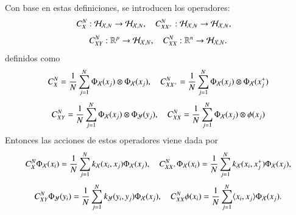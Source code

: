Con base en estas definiciones, se introducen los operadores:
\begin{equation*}
    C_{X}^N : \mathcal{H}_{\mathcal{X}, N} \to \mathcal{H}_{\mathcal{X}, N}, \quad C_{XX^+}^N : \mathcal{H}_{\mathcal{X}, N} \to \mathcal{H}_{\mathcal{X}, N}, \quad 
\end{equation*}
\begin{equation*}
    C_{XY}^N : \mathbb{R}^p \to \mathcal{H}_{\mathcal{X}, N}, \quad C_{XX}^N : \mathbb{R}^n \to \mathcal{H}_{\mathcal{X}, N}.
\end{equation*}
definidos como
\[
C_X^N = \frac{1}{N} \sum_{j=1}^N \Phi_{\mathcal{X}} (x_j) \otimes \Phi_{\mathcal{X}} (x_j), \quad C_{XX^+}^N = \frac{1}{N} \sum_{j=1}^N \Phi_{\mathcal{X}} (x_j) \otimes \Phi_{\mathcal{X}} (x_j^+)
\]
\[
C_{XY}^N = \frac{1}{N} \sum_{j=1}^N \Phi_{\mathcal{X}} (x_j) \otimes \Phi_{\mathcal{Y}} (y_j), \quad C_{XX}^N = \frac{1}{N} \sum_{j=1}^N \Phi_{\mathcal{X}} (x_j) \otimes \phi (x_j)
\]
Entonces las acciones de estos operadores viene dada por
\begin{equation*}
    C_{X}^N \Phi_{\mathcal{X}} (x_i) = \frac{1}{N} \sum_{j = 1}^N k_{\mathcal{X}}(x_i, x_j) \Phi_{\mathcal{X}} (x_j), \quad C_{XX^+}^N \Phi_{\mathcal{X}} (x_i) = \frac{1}{N} \sum_{j = 1}^N k_{\mathcal{X}}(x_i, x_j^+) \Phi_{\mathcal{X}} (x_j),
\end{equation*}
\begin{equation*}
        C_{XY}^N \Phi_{\mathcal{Y}} (y_i) = \frac{1}{N} \sum_{j = 1}^N k_{\mathcal{Y}} (y_i, y_j) \Phi_{\mathcal{X}} (x_j), \quad C_{XX}^N \phi (x_i) = \frac{1}{N} \sum_{j = 1}^N \langle x_i, x_j \rangle \Phi_{\mathcal{X}} (x_j).
\end{equation*}

